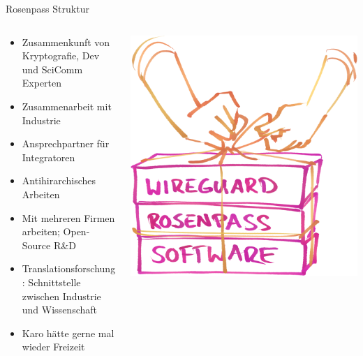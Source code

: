 \documentclass{rosenpass-beamer}
\begin{document}
\begin{frame}{Rosenpass Struktur}
\begin{columns}[c]
\begin{column}{0.7\textwidth}
\begin{itemize}
  \item Zusammenkunft von Kryptografie, Dev und SciComm Experten
  \item Zusammenarbeit mit Industrie
  \item Ansprechpartner für Integratoren
  \item Antihirarchisches Arbeiten
  \item Mit mehreren Firmen arbeiten; Open-Source R\&D
  \item Translationsforschung: Schnittstelle zwischen Industrie und Wissenschaft
  \item Karo hätte gerne mal wieder Freizeit
\end{itemize}
\end{column}

\begin{column}{0.2\textwidth}
\includegraphics[width=\linewidth]{graphics/rosenpass in anderen apps.png}


\end{column}
\end{columns}
\end{frame}
\end{document}
